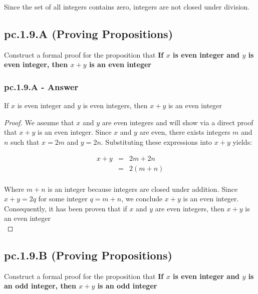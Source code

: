 Since the set of all integers contains zero, integers are not closed under division. \\


\newpage
\subsection{pc.1.9.A (Proving Propositions)}

Construct a formal proof for the proposition that {\bf If $x$ is even integer and $y$ is even integer, then $x + y$ is an even integer}

\subsubsection*{pc.1.9.A - Answer}

\begin{tcolorbox}
\begin{theorem}
If $x$ is even integer and $y$ is even integers, then $x + y$ is an even integer
\end{theorem}
\end{tcolorbox}

\begin{proof}

We assume that $x$ and $y$ are even integers and will show via a direct proof that $x + y$ is an even integer. Since $x$ and $y$ are even, there exists integers $m$ and $n$ such that $x = 2m$ and $y = 2n$. Substituting these expressions into $x + y$ yields:

\begin{eqnarray*}
x + y & = & 2m + 2n \nonumber \\
& = & 2(m + n) \nonumber \\
\end{eqnarray*}

Where $m + n$ is an integer because integers are closed under addition. Since $x + y = 2q$ for some integer $q = m + n$, we conclude $x + y$ is an even integer. Consequently, it has been proven that if $x$ and $y$ are even integers, then $x + y$ is an even integer \\

\end{proof}


\newpage
\subsection{pc.1.9.B (Proving Propositions)}

Construct a formal proof for the proposition that {\bf If $x$ is even integer and $y$ is an odd integer, then $x + y$ is an odd integer}

